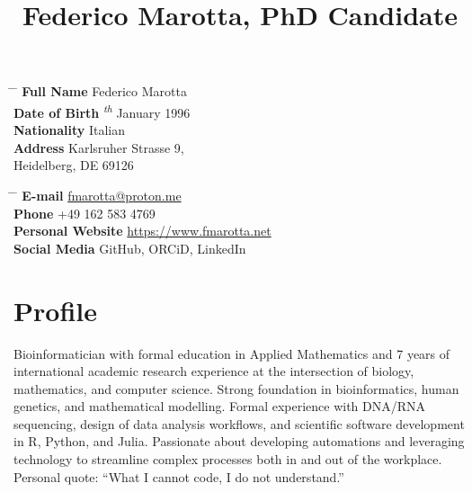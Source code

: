 \documentclass[10pt]{article} %
\begin{document}

\title{Federico Marotta, PhD Candidate} %


\parbox{0.5\textwidth}{ %
\begin{tabbing} %
\hspace{3cm} \= \hspace{4cm} \= \kill %
{\bf Full Name} \> Federico Marotta \\
{\bf Date of Birth} \textsuperscript{\textit{th}} January 1996 \\ %
{\bf Nationality} \> Italian \\ %
{\bf Address} \> Karlsruher Strasse 9,\\\phantom{\bf Address} \> Heidelberg, DE 69126 \\
\end{tabbing}}
\hfill %
\parbox{0.5\textwidth}{ %
\begin{tabbing} %
\hspace{3cm} \= \hspace{4cm} \= \kill %
{\bf E-mail} \> \href{mailto:fmarotta@proton.me}{fmarotta@proton.me} \\
{\bf Phone} \> +49 162 583 4769 \\
{\bf Personal Website} \> \href{https://www.fmarotta.net}{https://www.fmarotta.net} \\
{\bf Social Media} \> GitHub, ORCiD, LinkedIn \\
\end{tabbing}}


\section{Profile}

Bioinformatician with formal education in Applied Mathematics and 7 years of international academic research experience at the intersection of biology, mathematics, and computer science. Strong foundation in bioinformatics, human genetics, and mathematical modelling. Formal experience with DNA/RNA sequencing, design of data analysis workflows, and scientific software development in R, Python, and Julia. Passionate about developing automations and leveraging technology to streamline complex processes both in and out of the workplace. Personal quote: “What I cannot code, I do not understand.”
\end{document}
